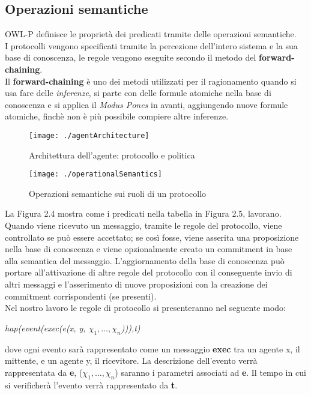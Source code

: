 \documentclass[a4paper,12pt]{report}
\begin{document}
\subsection{Operazioni semantiche}
OWL-P definisce le proprietà dei predicati tramite delle operazioni semantiche.\\
I protocolli vengono specificati tramite la percezione dell'intero sistema e la sua base di conoscenza, le regole vengono eseguite secondo il metodo del \textbf{forward-chaining}.\\
Il \textbf{forward-chaining} è uno dei metodi utilizzati per il ragionamento quando si usa fare delle \textit{inferenze}, si parte con delle formule atomiche nella base di conoscenza e si applica il \textit{Modus Pones} in avanti, aggiungendo nuove formule atomiche, finchè non è più possibile compiere altre inferenze.
\newpage
\begin{figure}[t]
    \begin{center}
        \texttt{[image: ./agentArchitecture]}
        \caption{Architettura dell'agente: protocollo e politica}
        \label{agentArchitecture}
    \end{center}
\end{figure}
\begin{figure}[h]
    \texttt{[image: ./operationalSemantics]}
    \caption{Operazioni semantiche sui ruoli di un protocollo}
    \label{operationSemantics}
\end{figure}
La Figura 2.4 mostra come i predicati nella tabella in Figura 2.5, lavorano.\\
Quando viene ricevuto un messaggio, tramite le regole del protocollo, viene controllato se può essere accettato; se così fosse, viene asserita una proposizione nella base di conoscenza e viene opzionalmente creato un commitment in base alla semantica del messaggio. L'aggiornamento della base di conoscenza può portare all'attivazione di altre regole del protocollo con il conseguente invio di altri messaggi e l'asserimento di nuove proposizioni con la creazione dei commitment corrispondenti (se presenti).\\
Nel nostro lavoro le regole di protocollo si presenteranno nel seguente modo:
\begin{center}
    \textit{hap(event(exec(e(x, y, $\chi_1,\dots,\chi_n$))),t)}
\end{center}
dove ogni evento sarà rappresentato come un messaggio \textbf{exec} tra un agente x, il mittente, e un agente y, il ricevitore. La descrizione dell'evento verrà rappresentata da \textbf{e}, ($\chi_1,\dots,\chi_n$) saranno i parametri associati ad \textbf{e}. Il tempo in cui si verificherà l'evento verrà rappresentato da \textbf{t}.
\newpage
\end{document}
